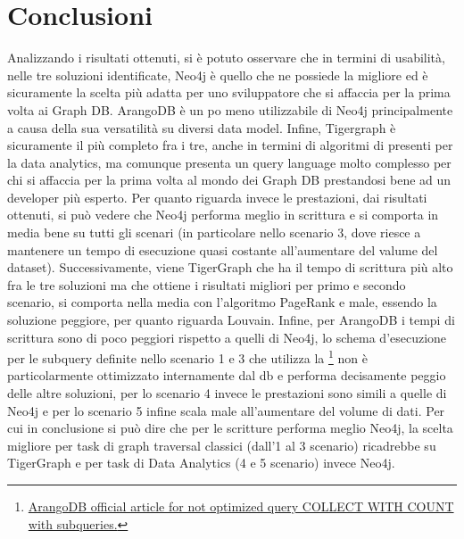 \documentclass[11pt]{article}
\newcommand{\codeinline}[1]{\tcbox{\lstinline[style=inline]|#1|}}
\begin{document}
\begin{itemize}
\end{itemize}

\section{Conclusioni}
Analizzando i risultati ottenuti, si è potuto osservare che in termini di usabilità, nelle tre soluzioni identificate, Neo4j è quello che ne possiede la migliore ed è sicuramente la scelta più adatta per uno sviluppatore che si affaccia per la prima volta ai Graph DB. ArangoDB è un po meno utilizzabile di Neo4j principalmente a causa della sua versatilità su diversi data model. Infine, Tigergraph è sicuramente il più completo fra i tre, anche in termini di algoritmi di presenti per la data analytics, ma comunque presenta un query language molto complesso per chi si affaccia per la prima volta al mondo dei Graph DB prestandosi bene ad un developer più esperto.
\newline Per quanto riguarda invece le prestazioni, dai risultati ottenuti, si può vedere che Neo4j performa meglio in scrittura e si comporta in media bene su tutti gli scenari (in particolare nello scenario 3, dove riesce a mantenere un tempo di esecuzione quasi costante all'aumentare del valume del dataset). Successivamente, viene TigerGraph che ha il tempo di scrittura più alto fra le tre soluzioni ma che ottiene i risultati migliori per primo e secondo scenario, si comporta nella media con l'algoritmo PageRank e male, essendo la soluzione peggiore, per quanto riguarda Louvain. Infine, per ArangoDB i tempi di scrittura sono di poco peggiori rispetto a quelli di Neo4j, lo schema d'esecuzione per le subquery definite nello scenario 1 e 3 che utilizza la \codeinline{COLLECT WITH COUNT}\footnote{\href{https://www.arangodb.com/learn/documents/making-subqueries-fast/}{ArangoDB official article for not optimized query COLLECT WITH COUNT with subqueries.}} non è particolarmente ottimizzato internamente dal db e performa decisamente peggio delle altre soluzioni, per lo scenario 4 invece le prestazioni sono simili a quelle di Neo4j e per lo scenario 5 infine scala male all'aumentare del volume di dati. \newline
Per cui in conclusione si può dire che per le scritture performa meglio Neo4j, la scelta migliore per task di graph traversal classici (dall'1 al 3 scenario) ricadrebbe su TigerGraph e per task di Data Analytics (4 e 5 scenario)     invece Neo4j. 
\end{document}

